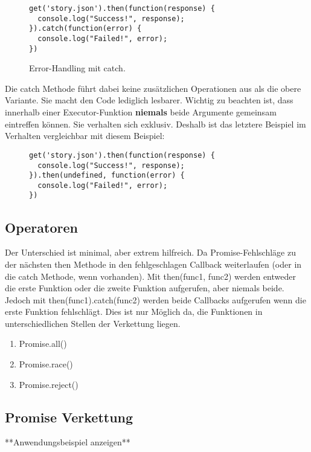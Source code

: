 \begin{figure}[H]
\begin{lstlisting}
get('story.json').then(function(response) {
  console.log("Success!", response);
}).catch(function(error) {
  console.log("Failed!", error);
})
\end{lstlisting}
\caption{Error-Handling mit catch. \cite{callback-vs-promises}}
\end{figure}

\noindent
Die catch Methode führt dabei keine zusätzlichen Operationen aus als die obere Variante. Sie macht den Code lediglich lesbarer. Wichtig zu beachten ist, dass innerhalb einer Executor-Funktion \textbf{niemals} beide Argumente gemeinsam eintreffen können. Sie verhalten sich exklusiv. Deshalb ist das letztere Beispiel im Verhalten vergleichbar mit diesem Beispiel:

\begin{figure}[H]
\begin{lstlisting}
get('story.json').then(function(response) {
  console.log("Success!", response);
}).then(undefined, function(error) {
  console.log("Failed!", error);
})
\end{lstlisting}
\end{figure}
\subsection{Operatoren}

Der Unterschied ist minimal, aber extrem hilfreich. Da Promise-Fehlschläge zu der nächsten then Methode in den fehlgeschlagen Callback weiterlaufen (oder in die catch Methode, wenn vorhanden). Mit then(func1, func2) werden entweder die erste Funktion oder die zweite Funktion aufgerufen, aber niemals beide. Jedoch mit then(func1).catch(func2) werden beide Callbacks aufgerufen wenn die erste Funktion fehlschlägt. Dies ist nur Möglich da, die Funktionen in unterschiedlichen Stellen der Verkettung liegen.


\begin{enumerate} 
\item Promise.all()
\item Promise.race() 
\item Promise.reject()
\end{enumerate}

\subsection{Promise Verkettung}
**Anwendungsbeispiel anzeigen**

